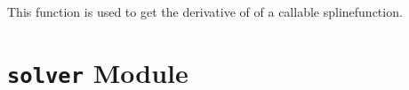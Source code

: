 \documentclass[letterpaper,10pt,english]{sphinxmanual}
\begin{document}

\begin{fulllineitems}
\label{pytrajectory:pytrajectory.spline.fdiff}
This function is used to get the derivative of of a callable splinefunction.
\begin{quote}\begin{description}
\end{description}\end{quote}

\end{fulllineitems}



\section{\texttt{solver} Module}
\label{pytrajectory:module-pytrajectory.solver}\label{pytrajectory:solver-module}
\end{document}
